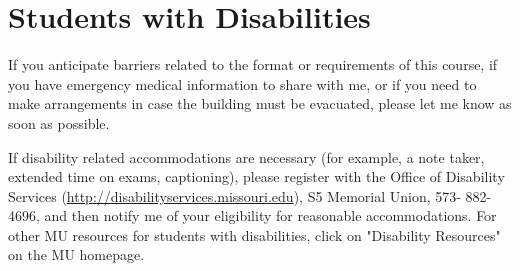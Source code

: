 \documentclass[11pt]{article}
\begin{document}
\section{Students with Disabilities}

If you anticipate barriers related to the format or requirements of this course, if you have emergency medical information to share with me, or if you need to make arrangements in case the building must be evacuated, please let me know as soon as possible.

If disability related accommodations are necessary (for example, a note taker, extended time on exams, captioning), please register with the Office of Disability Services (\url{http://disabilityservices.missouri.edu}), S5 Memorial Union, 573- 882-4696, and then notify me of your eligibility for reasonable accommodations.  For other MU resources for students with disabilities, click on "Disability Resources" on the MU homepage.
\end{document}
